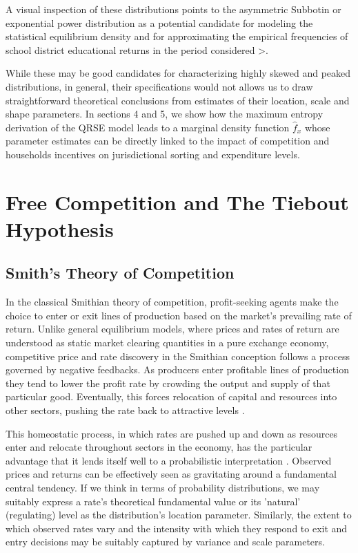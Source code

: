 A visual inspection of these distributions points to the asymmetric
Subbotin or exponential power distribution \citep{alfarano_statistical_2012} as a potential candidate for modeling the statistical
equilibrium density and for approximating the empirical frequencies of
school district educational returns in the period considered
\citep{fruhwirth-schnatter_mixture_2015}>.

While these may be good candidates for characterizing highly skewed and
peaked distributions, in general, their specifications would not allows us to draw
straightforward theoretical conclusions from estimates of their
location, scale and shape parameters. In sections 4 and 5, we show how
the maximum entropy derivation of the QRSE model leads to a marginal
density function $\hat{f}_{x}$ whose parameter estimates can be
directly linked to the impact of competition and households incentives
on jurisdictional sorting and expenditure levels.




\section{Free Competition and The Tiebout Hypothesis}
\label{sec-3}

\subsection{Smith's Theory of Competition}
\label{sec-3-1}

In the classical Smithian theory of competition, profit-seeking agents
make the choice to enter or exit lines of production based on the
market's prevailing rate of return. Unlike general equilibrium models,
where prices and rates of return are understood as static market
clearing quantities in a pure exchange economy, competitive price and
rate discovery in the Smithian conception follows a process governed
by negative feedbacks. As producers enter profitable lines of
production they tend to lower the profit rate by crowding the output
and supply of that particular good. Eventually, this forces relocation
of capital and resources into other sectors, pushing the rate back to
attractive levels
\citep{smith_wealth_1937,schafol,shaikh_capitalism_2016}.

This homeostatic process, in which rates are pushed up and down as
resources enter and relocate throughout sectors in the economy, has
the particular advantage that it lends itself well to a probabilistic
interpretation \citep{farjoun_laws_2020}. Observed prices and
returns can be effectively seen as gravitating around a fundamental
central tendency. If we think in terms of probability distributions,
we may suitably express a rate's theoretical fundamental value or its
'natural' (regulating) level as the distribution's location
parameter. Similarly, the extent to which observed rates vary and the
intensity with which they respond to exit and entry decisions may be
suitably captured by variance and scale parameters.

